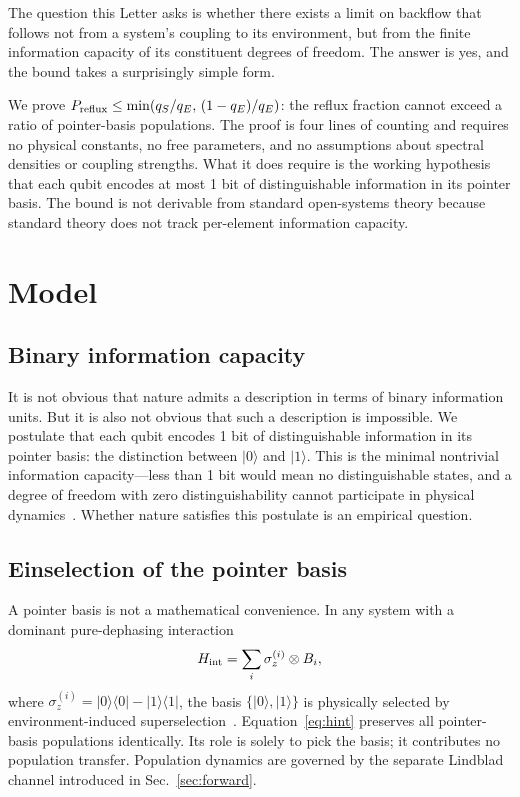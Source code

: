 \documentclass[aps,prl,twocolumn,superscriptaddress,hyperref]{revtex4-2}
\begin{document}
The question this Letter asks is whether there exists a limit on backflow that follows not from a system's coupling to its environment, but from the finite information capacity of its constituent degrees of freedom. The answer is yes, and the bound takes a surprisingly simple form.

We prove $P_{\rm reflux} \leq \min(q_S/q_E,\,(1-q_E)/q_E)$: the reflux fraction cannot exceed a ratio of pointer-basis populations. The proof is four lines of counting and requires no physical constants, no free parameters, and no assumptions about spectral densities or coupling strengths. What it does require is the working hypothesis that each qubit encodes at most 1 bit of distinguishable information in its pointer basis. The bound is not derivable from standard open-systems theory because standard theory does not track per-element information capacity.

\section{Model}

\subsection{Binary information capacity}

It is not obvious that nature admits a description in terms of binary information units. But it is also not obvious that such a description is impossible. We postulate that each qubit encodes 1 bit of distinguishable information in its pointer basis: the distinction between $|0\rangle$ and $|1\rangle$. This is the minimal nontrivial information capacity---less than 1 bit would mean no distinguishable states, and a degree of freedom with zero distinguishability cannot participate in physical dynamics~\cite{Shannon:1948}. Whether nature satisfies this postulate is an empirical question.

\subsection{Einselection of the pointer basis}

A pointer basis is not a mathematical convenience. In any system with a dominant pure-dephasing interaction
\begin{equation}
H_{\rm int} = \sum_{i} \sigma_z^{(i)} \otimes B_i,
\label{eq:hint}
\end{equation}
where $\sigma_z^{(i)} = |0\rangle\langle 0| - |1\rangle\langle 1|$, the basis $\{|0\rangle,|1\rangle\}$ is physically selected by environment-induced superselection~\cite{Zurek:2003}. Equation~\eqref{eq:hint} preserves all pointer-basis populations identically. Its role is solely to pick the basis; it contributes no population transfer. Population dynamics are governed by the separate Lindblad channel introduced in Sec.~\ref{sec:forward}.
\end{document}
